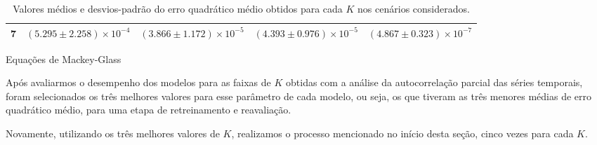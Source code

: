 \documentclass[a4paper, 12pt]{article}
\begin{document}
\begin{table}[H]
\begin{center}
\begin{subtable}{1\textwidth}
\begin{center}
{\begin{tabular}{c c c c c}
 \hline
 \addlinespace
 $\bm{7}$ & $(5.295 \pm 2.258) \times 10^{-4}$ & $(3.866 \pm 1.172) \times 10^{-5}$ & $(4.393 \pm 0.976) \times 10^{-5}$ & $(4.867 \pm 0.323) \times 10^{-7}$\\
 \bottomrule
\end{tabular}}
\caption{Equações de Mackey-Glass}
\label{tab:mackeyglass-eqm}
\end{center}
\end{subtable}
\caption{Valores médios e desvios-padrão do erro quadrático médio obtidos para cada $K$ nos cenários considerados.}
\label{tab:eqm-results}
\end{center}
\end{table}

Após avaliarmos o desempenho dos modelos para as faixas de $K$ obtidas com a análise da autocorrelação parcial das séries temporais, foram selecionados os três melhores valores para esse parâmetro de cada modelo, ou seja, os que tiveram as três menores médias de erro quadrático médio, para uma etapa de retreinamento e reavaliação. 

Novamente, utilizando os três melhores valores de $K$, realizamos o processo mencionado no início desta seção, cinco vezes para cada $K$. 
\end{document}
